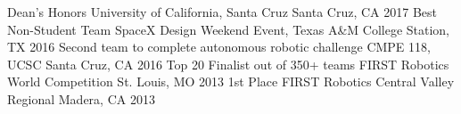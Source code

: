 \begin{cvhonors}
  \cvhonor
    {Dean's Honors}
    {University of California, Santa Cruz}
    {Santa Cruz, CA}
    {2017}
  \cvhonor
    {Best Non-Student Team}
    {SpaceX Design Weekend Event, Texas A\&M}
    {College Station, TX}
    {2016}
  \cvhonor
    {Second team to complete autonomous robotic challenge}
    {CMPE 118, UCSC}
    {Santa Cruz, CA}
    {2016}
  \cvhonor
    {Top 20 Finalist out of 350+ teams}
    {FIRST Robotics World Competition}
    {St. Louis, MO}
    {2013}
  \cvhonor
    {1st Place}
    {FIRST Robotics Central Valley Regional}
    {Madera, CA}
    {2013}
\end{cvhonors}